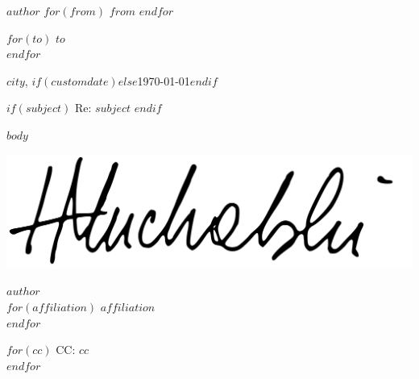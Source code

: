 \documentclass[$fontsize$, letterpaper]{article}
\begin{document}
\small
\textsc{\textbf{$author$}} 
$for(from)$
\textbullet{} \textsc{$from$} 
$endfor$

\vspace{3em}

\normalsize \rmfamily
$for(to)$
$to$\\
$endfor$



\rmfamily
\begin{flushright}
  $city$, $if(customdate)$$else$\today$endif$
\end{flushright}

$if(subject)$
Re: \textbf{$subject$}
$endif$

\vspace{1em}

$body$
\begin{FlushLeft}
  {
    \includegraphics[height=2.5\baselineskip]{signature.pdf} \par
  }
  {
    \vspace{2.5\baselineskip}
  }
  $author$\\
  $for(affiliation)$
  $affiliation$\\
  $endfor$
\end{FlushLeft}

\vspace{1em}
$for(cc)$
  CC: $cc$\\
$endfor$
\end{document}
